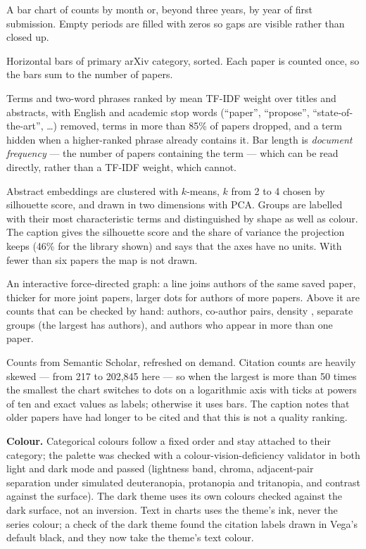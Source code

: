 \documentclass[11pt,a4paper]{article}
\begin{document}
\begin{description}[leftmargin=0pt]
\item[Papers over time.] A bar chart of counts by month or, beyond three years, by year of first
  submission. Empty periods are filled with zeros so gaps are visible rather than closed up.
\item[Categories.] Horizontal bars of primary arXiv category, sorted. Each paper is counted once, so the
  bars sum to the number of papers.
\item[Characteristic terms.] Terms and two-word phrases ranked by mean TF-IDF weight over titles and
  abstracts, with English and academic stop words (``paper'', ``propose'', ``state-of-the-art'', \ldots)
  removed, terms in more than 85\% of papers dropped, and a term hidden when a higher-ranked phrase already
  contains it. Bar length is \emph{document frequency} --- the number of papers containing the term --- which
  can be read directly, rather than a TF-IDF weight, which cannot.
\item[Topic map.] Abstract embeddings are clustered with $k$-means, $k$ from 2 to 4 chosen by silhouette
  score, and drawn in two dimensions with PCA. Groups are labelled with their most characteristic terms and
  distinguished by shape as well as colour. The caption gives the silhouette score and the share of variance
  the projection keeps (46\% for the library shown) and says that the axes have no units. With fewer than
  six papers the map is not drawn.
\item[Co-author network.] An interactive force-directed graph: a line joins authors of the same saved paper,
  thicker for more joint papers, larger dots for authors of more papers. Above it are counts that can be
  checked by hand: \mAuthors{} authors, \mPairs{} co-author pairs, density \mDensity, \mGroups{} separate groups
  (the largest has \mLargestGroup{} authors), and \mRecurring{} authors who appear in more than one paper.
\item[Citations.] Counts from Semantic Scholar, refreshed on demand. Citation counts are heavily skewed ---
  from 217 to 202,845 here --- so when the largest is more than 50 times the smallest the chart switches to
  dots on a logarithmic axis with ticks at powers of ten and exact values as labels; otherwise it uses bars.
  The caption notes that older papers have had longer to be cited and that this is not a quality ranking.
\end{description}

\noindent\textbf{Colour.} Categorical colours follow a fixed order and stay attached to their category; the
palette was checked with a colour-vision-deficiency validator in both light and dark mode and passed
(lightness band, chroma, adjacent-pair separation under simulated deuteranopia, protanopia and tritanopia,
and contrast against the surface). The dark theme uses its own colours checked against the dark surface,
not an inversion. Text in charts uses the theme's ink, never the series colour; a check of the dark theme
found the citation labels drawn in Vega's default black, and they now take the theme's text colour.
\end{document}
